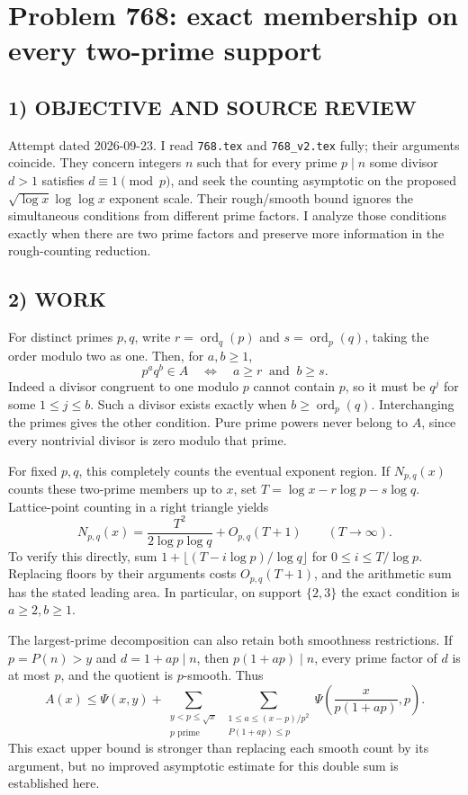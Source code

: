\section{Problem 768: exact membership on every two-prime support}
\subsection*{1) OBJECTIVE AND SOURCE REVIEW}
Attempt dated 2026-09-23. I read \texttt{768.tex} and \texttt{768\_v2.tex} fully; their arguments coincide. They concern integers $n$ such that for every prime $p\mid n$ some divisor $d>1$ satisfies $d\equiv1\pmod p$, and seek the counting asymptotic on the proposed $\sqrt{\log x}\log\log x$ exponent scale. Their rough/smooth bound ignores the simultaneous conditions from different prime factors. I analyze those conditions exactly when there are two prime factors and preserve more information in the rough-counting reduction.
\subsection*{2) WORK}
For distinct primes $p,q$, write $r=\operatorname{ord}_q(p)$ and $s=\operatorname{ord}_p(q)$, taking the order modulo two as one. Then, for $a,b\ge1$,
\[
p^a q^b\in A\quad\Longleftrightarrow\quad a\ge r\ \text{ and }\ b\ge s.
\]
Indeed a divisor congruent to one modulo $p$ cannot contain $p$, so it must be $q^j$ for some $1\le j\le b$. Such a divisor exists exactly when $b\ge\operatorname{ord}_p(q)$. Interchanging the primes gives the other condition. Pure prime powers never belong to $A$, since every nontrivial divisor is zero modulo that prime.

For fixed $p,q$, this completely counts the eventual exponent region. If $N_{p,q}(x)$ counts these two-prime members up to $x$, set $T=\log x-r\log p-s\log q$. Lattice-point counting in a right triangle yields
\[
N_{p,q}(x)=\frac{T^2}{2\log p\log q}+O_{p,q}(T+1)
\qquad(T\to\infty).
\]
To verify this directly, sum $1+\lfloor(T-i\log p)/\log q\rfloor$ for $0\le i\le T/\log p$. Replacing floors by their arguments costs $O_{p,q}(T+1)$, and the arithmetic sum has the stated leading area. In particular, on support $\{2,3\}$ the exact condition is $a\ge2,b\ge1$.

The largest-prime decomposition can also retain both smoothness restrictions. If $p=P(n)>y$ and $d=1+ap\mid n$, then $p(1+ap)\mid n$, every prime factor of $d$ is at most $p$, and the quotient is $p$-smooth. Thus
\[
A(x)\le\Psi(x,y)+
\sum_{\substack{y<p\le\sqrt x\\p\text{ prime}}}
\sum_{\substack{1\le a\le (x-p)/p^2\\P(1+ap)\le p}}
\Psi\left(\frac{x}{p(1+ap)},p\right).
\]
This exact upper bound is stronger than replacing each smooth count by its argument, but no improved asymptotic estimate for this double sum is established here.
